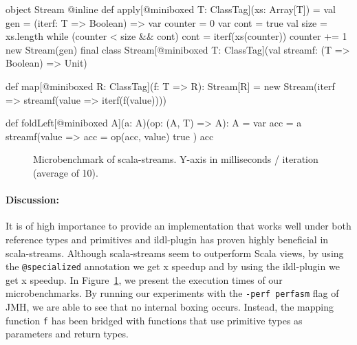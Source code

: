 \begin{lstlisting-nobreak}[language=scala, caption=Creation of a stream \& examples of
  operators., label=lst:operators]
object Stream {
  @inline def apply[@miniboxed T: ClassTag](xs: Array[T]) = {
    val gen = (iterf: T => Boolean) => {
      var counter = 0
      var cont = true
      val size = xs.length
      while (counter < size && cont) {
        cont = iterf(xs(counter))
        counter += 1
      }
    }
  }
  new Stream(gen)
}
final class Stream[@miniboxed T: ClassTag](val streamf: (T => Boolean) => Unit) {
  def map[@miniboxed R: ClassTag](f: T => R): Stream[R] = 
    new Stream(iterf => streamf(value => iterf(f(value))))

  def foldLeft[@miniboxed A](a: A)(op: (A, T) => A): A = {
    var acc = a
    streamf(value => {
      acc = op(acc, value)
      true
    })
    acc
  }
}
\end{lstlisting-nobreak}
\begin{figure}
  \centering
  \caption{Microbenchmark of scala-streams. Y-axis in milliseconds / iteration (average of 10).}
  \label{fig:stream_benchmarks}
\end{figure}
\paragraph{Discussion: }  It is of high importance to provide an implementation
that works well under both reference types and primitives and ildl-plugin has
proven highly beneficial in scala-streams. Although scala-streams seem to
outperform Scala views, by using the \verb|@specialized| annotation we get
x speedup and by using the ildl-plugin we get x
speedup. In Figure~\ref{fig:stream_benchmarks}, we present the execution times
of our microbenchmarks. By running our experiments with the \verb|-perf perfasm|
flag of JMH, we are able to see that no internal boxing occurs. Instead, the
mapping function \verb|f| has been bridged with functions that use primitive
types as parameters and return types.



